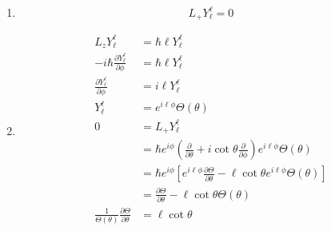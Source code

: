 \documentclass{article}
\begin{document}
\begin{enumerate}
  \item \[L_+ Y_\ell^\ell = 0\]

  \item

        \begin{align*}
          L_z Y_\ell^\ell                                                  & = \hbar \ell Y_\ell^\ell                                                                                                                         \\
          -i \hbar \frac{\partial Y_\ell^\ell}{\partial \phi}              & = \hbar \ell Y_\ell^\ell                                                                                                                         \\
          \frac{\partial Y_\ell^\ell}{\partial \phi}                       & = i \ell Y_\ell^\ell                                                                                                                             \\
          Y_\ell^\ell                                                      & = e^{i \ell \phi} \Theta(\theta)                                                                                                                 \\
          0                                                                & = L_+ Y_\ell^\ell                                                                                                                                \\
                                                                           & = \hbar e^{i \phi} \left( \frac{\partial}{\partial \theta} + i \cot \theta \frac{\partial}{\partial \phi} \right) e^{i \ell \phi} \Theta(\theta) \\
                                                                           & = \hbar e^{i \phi} \left[ e^{i \ell \phi} \frac{\partial \Theta}{\partial \theta} - \ell \cot \theta e^{i \ell \phi} \Theta(\theta) \right]      \\
                                                                           & = \frac{\partial \Theta}{\partial \theta} - \ell \cot \theta \Theta(\theta)                                                                      \\
          \frac{1}{\Theta(\theta)} \frac{\partial \Theta}{\partial \theta} & = \ell \cot \theta                                                                                                                               \\

\end{align*}
\end{enumerate}
\end{document}
